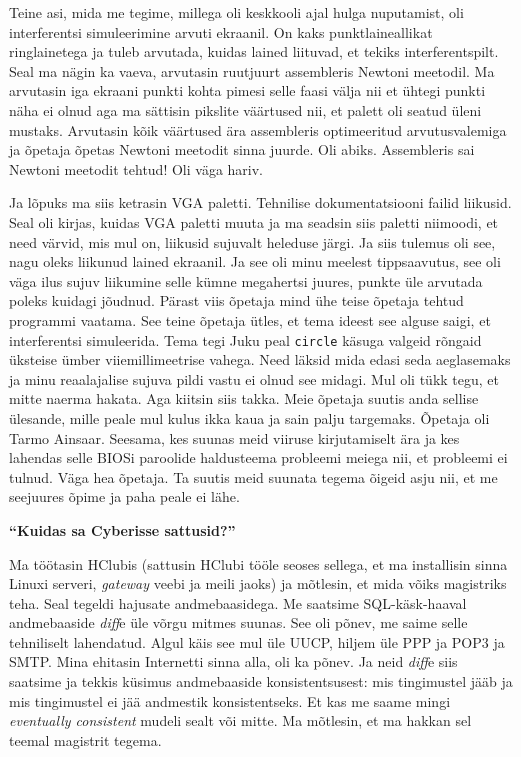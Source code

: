 Teine asi, mida me tegime, millega oli keskkooli ajal hulga nuputamist, oli interferentsi simuleerimine arvuti ekraanil. On kaks punktlaineallikat ringlainetega ja tuleb arvutada, kuidas lained liituvad, et tekiks interferentspilt. Seal ma nägin ka vaeva, arvutasin ruutjuurt assembleris Newtoni meetodil. Ma arvutasin iga ekraani punkti kohta pimesi selle faasi välja nii et ühtegi punkti näha ei olnud aga ma sättisin pikslite väärtused nii, et palett oli seatud üleni mustaks. Arvutasin kõik väärtused ära assembleris optimeeritud arvutusvalemiga ja õpetaja õpetas Newtoni meetodit sinna juurde. Oli abiks. Assembleris sai Newtoni meetodit tehtud! Oli väga hariv. 

Ja lõpuks ma siis ketrasin VGA paletti. Tehnilise dokumentatsiooni failid liikusid. Seal oli kirjas, kuidas VGA paletti muuta ja ma seadsin siis paletti niimoodi, et need värvid, mis mul on, liikusid sujuvalt heleduse järgi. Ja siis tulemus oli see, nagu oleks liikunud lained ekraanil. Ja see oli minu meelest tippsaavutus, see oli väga ilus sujuv liikumine selle kümne megahertsi juures, punkte üle arvutada poleks kuidagi jõudnud. Pärast viis õpetaja mind ühe teise õpetaja tehtud programmi vaatama. See teine õpetaja ütles, et tema ideest see alguse saigi, et interferentsi simuleerida. Tema tegi Juku peal \verb|circle| käsuga valgeid rõngaid üksteise ümber viiemillimeetrise vahega. Need läksid mida edasi seda aeglasemaks ja minu reaalajalise sujuva pildi vastu ei olnud see midagi. Mul oli tükk tegu, et mitte naerma hakata. Aga kiitsin siis takka. Meie õpetaja suutis anda sellise ülesande, mille peale mul kulus ikka kaua ja sain palju targemaks. Õpetaja oli Tarmo Ainsaar. Seesama, kes suunas meid viiruse kirjutamiselt ära ja kes lahendas selle BIOSi paroolide haldusteema probleemi meiega nii, et probleemi ei tulnud. Väga hea õpetaja. Ta suutis meid suunata tegema õigeid asju nii, et me seejuures õpime ja paha peale ei lähe. 

\textbf{\enquote{Kuidas sa Cyberisse sattusid?}}

Ma töötasin HClubis (sattusin HClubi tööle seoses sellega, et ma installisin sinna Linuxi serveri, \emph{gateway} veebi ja meili jaoks) ja mõtlesin, et mida võiks magistriks teha. Seal tegeldi hajusate andmebaasidega. Me saatsime SQL-käsk-haaval andmebaaside \emph{diff}e üle võrgu mitmes suunas. See oli põnev, me saime selle tehniliselt lahendatud. Algul käis see mul üle UUCP, hiljem üle PPP ja POP3 ja SMTP. Mina ehitasin Internetti sinna alla, oli ka põnev. Ja neid \emph{diff}e siis saatsime ja tekkis küsimus andmebaaside konsistentsusest: mis tingimustel jääb ja mis tingimustel ei jää andmestik konsistentseks. Et kas me saame mingi \emph{eventually consistent} mudeli sealt või mitte. Ma mõtlesin, et ma hakkan sel teemal magistrit tegema.

